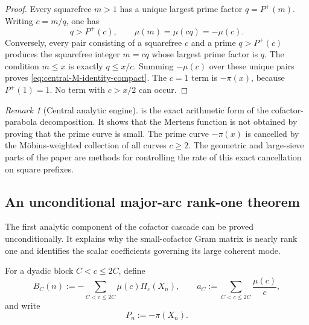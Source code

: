 \documentclass[11pt]{article}
\theoremstyle{definition}
\theoremstyle{remark}
\newtheorem{remark}[theorem]{Remark}
\newcommand{\Pplus}{P^{+}}
\newcommand{\1}{\mathbf{1}}
\begin{document}
\begin{proof}
Every squarefree $m>1$ has a unique largest prime factor
$q=\Pplus(m)$.  Writing $c=m/q$, one has
\[
 q>\Pplus(c),
 \qquad
 \mu(m)=\mu(cq)=-\mu(c).
\]
Conversely, every pair consisting of a squarefree $c$ and a prime
$q>\Pplus(c)$ produces the squarefree integer $m=cq$ whose largest
prime factor is $q$.  The condition $m\le x$ is exactly $q\le x/c$.
Summing $-\mu(c)$ over these unique pairs proves
\cref{eq:central-M-identity-compact}.  The $c=1$ term is
$-\pi(x)$, because $\Pplus(1)=1$.  No term with $c>x/2$ can occur.
\end{proof}

\begin{remark}[Central analytic engine]
 is the exact arithmetic form of the
cofactor-parabola decomposition.  It shows that the Mertens function is
not obtained by proving that the prime curve is small.  The prime curve
$-\pi(x)$ is cancelled by the M\"obius-weighted collection of all
curves $c\ge2$.  The geometric and large-sieve parts of the paper are
methods for controlling the rate of this exact cancellation on square
prefixes.
\end{remark}


\subsection{An unconditional major-arc rank-one theorem}
\label{subsec:major-rank-one}

The first analytic component of the cofactor cascade can be proved
unconditionally.  It explains why the small-cofactor Gram matrix is
nearly rank one and identifies the scalar coefficients governing its
large coherent mode.

For a dyadic block $C<c\le2C$, define
\begin{equation}
 B_C(n)
 :=-\sum_{C<c\le2C}\mu(c)\Pi_c(X_n),
 \qquad
 a_C:=\sum_{C<c\le2C}\frac{\mu(c)}{c},
 \label{eq:block-vector-aC}
\end{equation}
and write
\begin{equation}
 P_n:=-\pi(X_n).
 \label{eq:prime-vector-P}
\end{equation}
\end{document}

